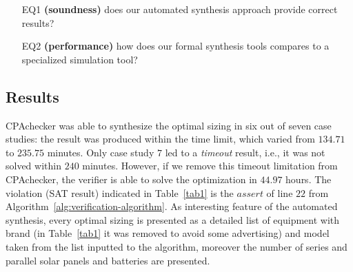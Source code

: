 \documentclass[journal]{IEEEtran}
\begin{document}
\begin{enumerate}

\item[EQ1] \textbf{(soundness)} does our automated synthesis approach provide correct results?

\item[EQ2] \textbf{(performance)} how does our formal synthesis tools compares to a specialized simulation tool?

\end{enumerate}

\subsection{Results}  

CPAchecker was able to synthesize the optimal sizing in six 
out of seven case studies: the result was produced within 
the time limit, which varied from $134.71$ to $235.75$ minutes. 
Only case study $7$ led to a \textit{timeout} result, i.e., 
it was not solved within $240$ minutes. However, if we remove 
this timeout limitation from CPAchecker, the verifier is 
able to solve the optimization in $44.97$ hours. 
The violation (SAT result) indicated in Table~\ref{tab1} 
is the $assert$ of line $22$ from Algorithm~\ref{alg:verification-algorithm}. %
As interesting feature of the automated synthesis, every optimal sizing is presented as a detailed list of equipment with brand (in Table~\ref{tab1} it was removed 
to avoid some advertising) and model taken from the list inputted to the algorithm, moreover the number of series and parallel solar panels and batteries are presented.
\end{document}
